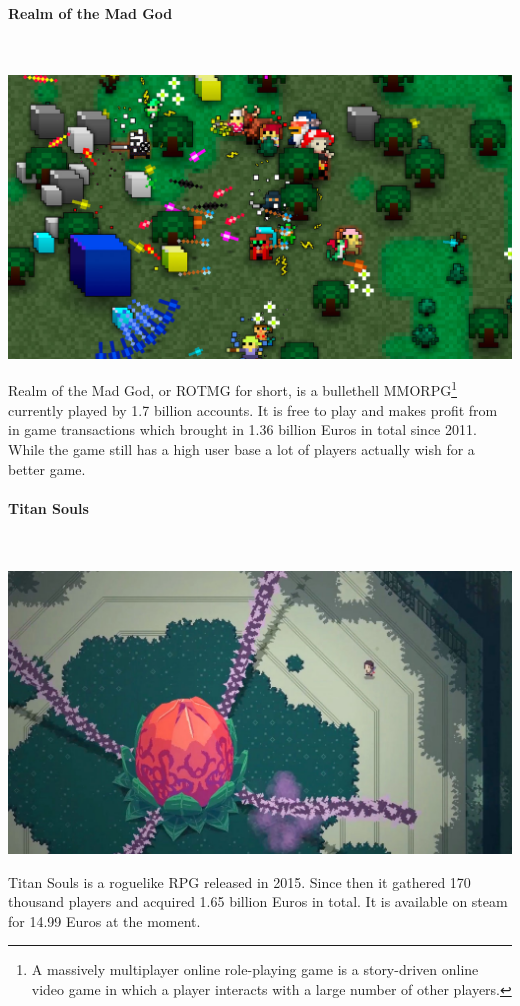 \documentclass[11pt]{article}
\begin{document}
\paragraph{Realm of the Mad God}~\\
\begin{center}
 \includegraphics[width=\textwidth]{./rotmg.jpg}
\end{center}
Realm of the Mad God, or ROTMG for short, is a bullethell MMORPG\footnote{A massively multiplayer online role-playing game is a story-driven online video game in which a player interacts with a large number of other players.} currently played by 1.7 billion accounts.
It is free to play and makes profit from in game transactions which brought in 1.36 billion Euros in total since 2011.\\
While the game still has a high user base a lot of players actually wish for a better game.

\paragraph{Titan Souls}~\\
\begin{center}
 \includegraphics[width=\textwidth]{./titan.jpg}
\end{center}
Titan Souls is a roguelike RPG released in 2015. Since then it gathered 170 thousand players and acquired 1.65 billion Euros in total. It is available on steam for 14.99 Euros at the moment.
\bigskip
\end{document}
